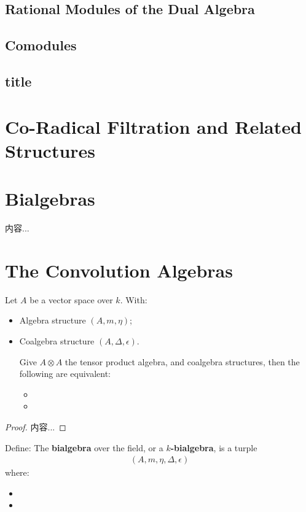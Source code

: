 \documentclass[Total.tex]{subfiles}
\begin{document}
		\section{Rational Modules of the Dual Algebra}
		\section{Comodules}
		\section{title}
	\chapter{Co-Radical Filtration and Related Structures}
	\chapter{Bialgebras}
		\begin{Def}
			内容...
		\end{Def}
	\chapter{The Convolution Algebras}
		\begin{lemma}
			Let $A$ be a vector space over $k$. With:
			\begin{itemize}
				\item Algebra structure $(A,m,\eta)$;
				\item Coalgebra structure $(A,\Delta,\epsilon)$.
				
				Give $A\otimes A$ the tensor product algebra, and coalgebra structures, then the following are equivalent:
				\begin{itemize}
					\item 
					\item 
				\end{itemize}
			\end{itemize}
		\end{lemma}
		\begin{proof}
			内容...
		\end{proof}
		
		\begin{Def}
			Define: The \textbf{bialgebra} over the field, or a \textbf{$k$-bialgebra}, is a turple
			\begin{gather*}
				(A,m,\eta,\Delta,\epsilon)
			\end{gather*}
			where:
			\begin{itemize}
				\item 
				\item 
			\end{itemize}
		\end{Def}
\end{document}
